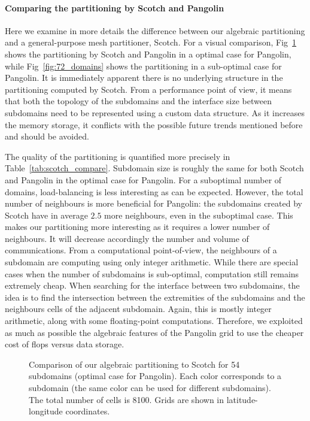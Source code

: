 \paragraph{Comparing the partitioning by Scotch and Pangolin}
Here we examine in more details the difference between our algebraic
partitioning and a general-purpose mesh partitioner, Scotch. For a visual
comparison, Fig~\ref{fig:54_domains} shows the partitioning by Scotch and
Pangolin in a optimal case for Pangolin, while Fig~\ref{fig:72_domains} shows
the partitioning in a sub-optimal case for Pangolin. It is immediately apparent
there is no underlying structure in the partitioning computed by Scotch. From a
performance point of view, it means that both the topology of the subdomains and
the interface size between subdomains need to be represented using a custom data
structure. As it increases the memory storage, it conflicts with the possible
future trends mentioned before and should be avoided.

The quality of the partitioning is quantified more precisely in
Table~\ref{tab:scotch_compare}. Subdomain size is roughly the same for both Scotch
and Pangolin in the optimal case for Pangolin. For a suboptimal number of
domains, load-balancing is less interesting as can be expected. However, the
total number of neighbours is more beneficial for Pangolin: the subdomains created
by Scotch have in average $2.5$ more neighbours, even in the suboptimal case.
This makes our partitioning more interesting as it requires a lower number of
neighbours.  It will decrease accordingly the number and volume of
communications. From a computational point-of-view, the neighbours of a subdomain
are computing using only integer arithmetic. While there are special cases when
the number of subdomains is sub-optimal, computation still remains extremely cheap.
When searching for the interface between two subdomains, the idea is to find the
intersection between the extremities of the subdomains and the neighbours cells of
the adjacent subdomain.  Again, this is mostly integer arithmetic, along with some
floating-point computations. Therefore, we exploited as much as possible the
algebraic features of the Pangolin grid to use the cheaper cost of flops versus
data storage.

\begin{figure}
  \hfill
  \caption{
    Comparison of our algebraic partitioning
     to Scotch  for 54 subdomains
    (optimal case for Pangolin).  Each color corresponds to a subdomain (the
    same color can be used for different subdomains). The total number of
    cells is 8100. Grids are shown in latitude-longitude coordinates.
  }
  \label{fig:54_domains}
\end{figure}


